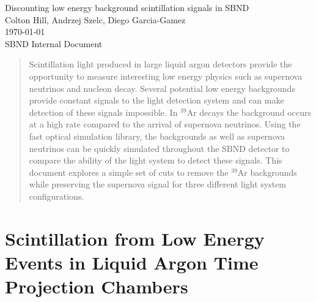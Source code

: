 \documentclass[a4paper]{article}
\begin{document}
\thispagestyle{empty}
\begin{center}
\Large{Discounting low energy background scintillation signals in SBND}\\[2pc]

\large{Colton Hill, Andrzej Szelc, Diego Garcia-Gamez}\\[0.5pc]
\large{\today}\\[2pc]

SBND Internal Document\\
\end{center}
\begin{abstract}
\noindent 

Scintillation light produced in large liquid argon detectors provide the opportunity to measure interesting low energy physics such as supernova neutrinos and nucleon decay. Several potential low energy backgrounds provide constant signals to the light detection system and can make detection of these signals impossible. In $^{39}$Ar decays the background occurs at a high rate compared to the arrival of supernova neutrinos. Using the fast optical simulation library, the backgrounds as well as supernova neutrinos can be quickly simulated throughout the SBND detector to compare the ability of the light system to detect these signals.  
This document explores a simple set of cuts to remove the $^{39}$Ar backgrounds while preserving the supernova signal for three different light system configurations.

\end{abstract}

\pagebreak
\tableofcontents
\pagebreak
\section{Scintillation from Low Energy Events in Liquid Argon Time Projection Chambers}
\end{document}
